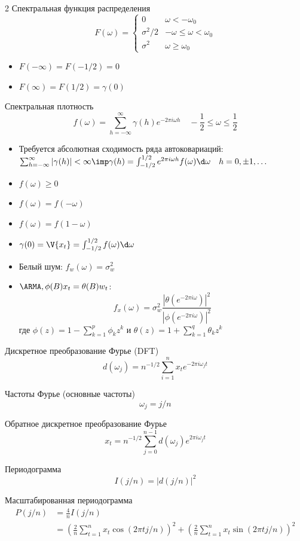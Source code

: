 \documentclass[landscape]{article}
\begin{document}
\begin{multicols*}{2}
Спектральная функция распределения
\[F(\omega)= \begin{cases}
  0 & \omega < -\omega_0 \\
  \sigma^2/2 & -\omega \le \omega < \omega_0 \\
  \sigma^2 & \omega \ge \omega_0
\end{cases}\]
\begin{itemize}
  \item $F(-\infty) = F(-1/2) = 0$
  \item $F(\infty) = F(1/2) = \gamma(0)$
\end{itemize}

Спектральная плотность
\[f(\omega) = \sum_{h=-\infty}^\infty \gamma(h) e^{-2\pi i \omega h}
\quad -\frac{1}{2} \le \omega \le \frac{1}{2}\]
\begin{itemize}
  \item Требуется абсолютная сходимость ряда автоковариаций: $\sum_{h=-\infty}^\infty |\gamma(h)| < \infty
    \imp \gamma(h) = \int_{-1/2}^{1/2} e^{2\pi i \omega h}f(\omega) \d\omega
    \quad h=0,\pm1,\ldots$
  \item $f(\omega) \ge 0$
  \item $f(\omega) = f(-\omega)$
  \item $f(\omega) = f(1-\omega)$
  \item $\gamma(0) = \V{x_t} = \int_{-1/2}^{1/2}f(\omega)\d\omega$
  \item Белый шум: $f_w(\omega) = \sigma_w^2$
  \item $\ARMA, \phi(B)x_t = \theta(B)w_t$:
    \[f_x(\omega) = \sigma_w^2 \frac{|\theta(e^{-2\pi i
    \omega})|^2}{|\phi(e^{-2\pi i \omega})|^2}\]
    где $\phi(z) = 1 - \sum_{k=1}^p \phi_k z^k$ и
    $\theta(z) = 1 + \sum_{k=1}^q \theta_k z^k$
\end{itemize}

Дискретное преобразование Фурье (DFT)
\[d(\omega_j) = n^{-1/2} \sum_{i=1}^n x_t e^{-2\pi i\omega_j t}\]

Частоты Фурье (основные частоты)
\[\omega_j = j/n\]

Обратное дискретное преобразование Фурье
\[x_t = n^{-1/2} \sum_{j=0}^{n-1} d(\omega_j) e^{2\pi i\omega_j t}\]

Периодограмма
\[I(j/n) = |d(j/n)|^2\]

Масштабированная периодограмма
\begin{align*}
P(j/n)
&= \frac{4}{n}I(j/n) \\
&=\left( \frac{2}{n} \sum_{t=1}^n x_t \cos(2\pi t j/n) \right)^2
+ \left( \frac{2}{n} \sum_{t=1}^n x_t \sin(2\pi t j/n) \right)^2
\end{align*}


\end{multicols*}
\end{document}
